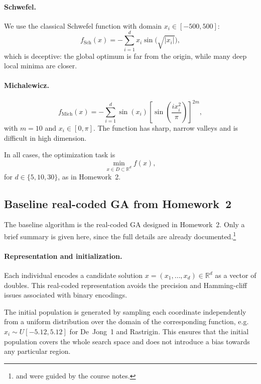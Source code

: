 \documentclass[11pt]{article}
\begin{document}
\paragraph{Schwefel.}
We use the classical Schwefel function with domain $x_i \in [-500,500]$:
\begin{equation}
  f_{\text{Sch}}(x) = - \sum_{i=1}^{d}
    x_i \sin\bigl(\sqrt{|x_i|}\bigr),
\end{equation}
which is deceptive: the global optimum is far from the origin, while many
deep local minima are closer.

\paragraph{Michalewicz.}
\begin{equation}
  f_{\text{Mich}}(x) = -
  \sum_{i=1}^{d} \sin(x_i)
  \left[ \sin\left( \frac{i x_i^2}{\pi} \right) \right]^{2m},
\end{equation}
with $m = 10$ and $x_i \in [0,\pi]$.
The function has sharp, narrow valleys and is difficult in high dimension.

In all cases, the optimization task is
\begin{equation}
  \min_{x \in D \subset \mathbb{R}^d} f(x),
\end{equation}
for $d \in \{5,10,30\}$, as in Homework~2.

\subsection{Baseline real-coded GA from Homework~2}

The baseline algorithm is the real-coded GA designed in Homework~2.
Only a brief summary is given here, since the full details are already
documented.\footnote{%
and were guided by the course notes.}

\paragraph{Representation and initialization.}
Each individual encodes a candidate solution
$x = (x_1,\dots,x_d) \in \mathbb{R}^d$ as a vector of doubles.
This real-coded representation avoids the precision and Hamming-cliff issues
associated with binary encodings.

The initial population is generated by sampling each coordinate independently
from a uniform distribution over the domain of the corresponding function,
e.g.\ $x_i \sim U[-5.12,5.12]$ for De~Jong~1 and Rastrigin.
This ensures that the initial population covers the whole search space and
does not introduce a bias towards any particular region.
\end{document}
